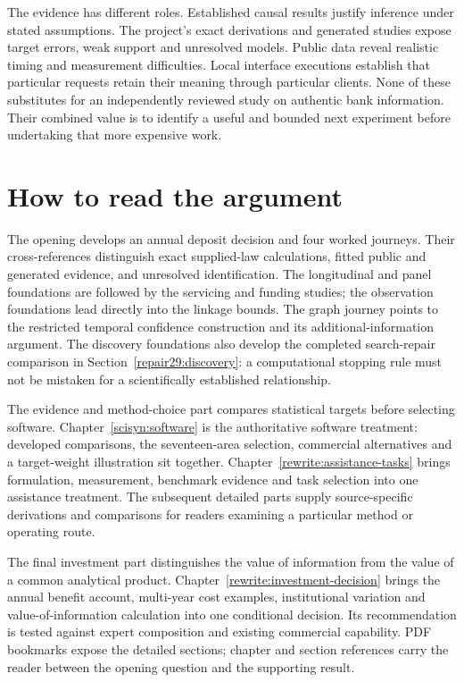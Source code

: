 The evidence has different roles. Established causal results justify inference
under stated assumptions. The project's exact derivations and generated studies
expose target errors, weak support and unresolved models. Public data reveal
realistic timing and measurement difficulties. Local interface executions
establish that particular requests retain their meaning through particular
clients. None of these substitutes for an independently reviewed study on
authentic bank information. Their combined value is to identify a useful and
bounded next experiment before undertaking that more expensive work.

\chapter*{How to read the argument}

The opening develops an annual deposit decision and four worked journeys.
Their cross-references distinguish exact supplied-law calculations, fitted
public and generated evidence, and unresolved identification. The longitudinal
and panel foundations are followed by the servicing and funding studies;
the observation foundations lead directly into the linkage bounds. The graph
journey points to the restricted temporal confidence construction and its
additional-information argument. The discovery foundations also develop the
completed search-repair comparison in Section~\ref{repair29:discovery}: a
computational stopping rule must not be mistaken for a scientifically
established relationship.

The evidence and method-choice part compares statistical targets before
selecting software. Chapter~\ref{scisyn:software} is the authoritative
software treatment: developed comparisons, the seventeen-area selection,
commercial alternatives and a target-weight illustration sit together.
Chapter~\ref{rewrite:assistance-tasks} brings formulation, measurement,
benchmark evidence and task selection into one assistance treatment.
The subsequent detailed parts supply source-specific derivations and
comparisons for readers examining a particular method or operating route.

The final investment part distinguishes the value of information from the
value of a common analytical product. Chapter~\ref{rewrite:investment-decision}
brings the annual benefit account, multi-year cost examples, institutional
variation and value-of-information calculation into one conditional decision.
Its recommendation is tested against expert composition and existing
commercial capability. PDF bookmarks expose the detailed sections; chapter
and section references carry the reader between the opening question and
the supporting result.


